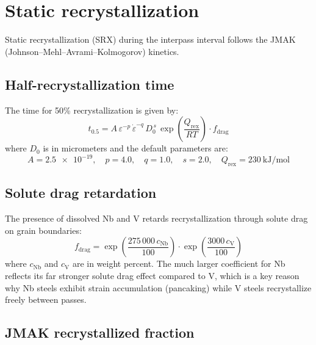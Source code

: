 \documentclass[11pt,a4paper]{article}
\newcommand{\epsrate}{\ensuremath{\dot\varepsilon}}
\begin{document}
\section{Static recrystallization}
\label{sec:rex}

Static recrystallization (SRX) during the interpass interval follows the JMAK
(Johnson--Mehl--Avrami--Kolmogorov) kinetics.

\subsection{Half-recrystallization time}

The time for 50\% recrystallization is given by:
\begin{equation}
  t_{0.5} = A\,\varepsilon^{-p}\,\epsrate^{-q}\,D_0^{\,s}\,
    \exp\!\left(\frac{Q_\mathrm{rex}}{RT}\right) \cdot f_\mathrm{drag}
  \label{eq:t50}
\end{equation}
where $D_0$ is in micrometers and the default
parameters are:
\begin{equation*}
  A = \num{2.5e-19},\quad p = 4.0,\quad q = 1.0,\quad s = 2.0,\quad
  Q_\mathrm{rex} = \SI{230}{\kilo\joule\per\mole}
\end{equation*}

\subsection{Solute drag retardation}

The presence of dissolved Nb and V retards recrystallization through solute drag
on grain boundaries:
\begin{equation}
  f_\mathrm{drag} = \exp\!\left(\frac{275\,000\,c_\mathrm{Nb}}{100}\right)
    \cdot \exp\!\left(\frac{3000\,c_\mathrm{V}}{100}\right)
  \label{eq:solutedrag}
\end{equation}
where $c_\mathrm{Nb}$ and $c_\mathrm{V}$ are in weight percent.  The much
larger coefficient for Nb reflects its far stronger solute drag effect
compared to V, which is a key reason why Nb steels exhibit strain
accumulation (pancaking) while V steels recrystallize freely between passes.

\subsection{JMAK recrystallized fraction}
\end{document}

